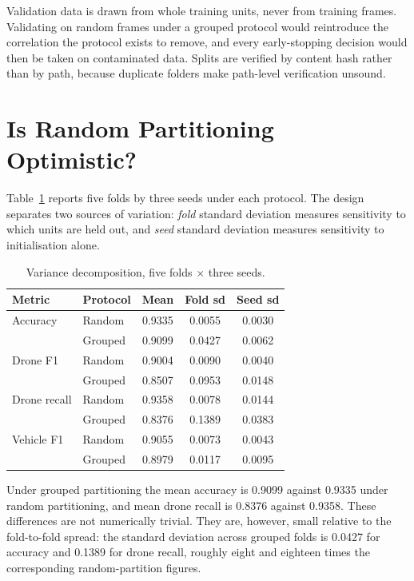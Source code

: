 \documentclass[conference]{IEEEtran}
\begin{document}
Validation data is drawn from whole training units, never from training
frames. Validating on random frames under a grouped protocol would
reintroduce the correlation the protocol exists to remove, and every
early-stopping decision would then be taken on contaminated data. Splits are
verified by content hash rather than by path, because duplicate folders make
path-level verification unsound.

\section{Is Random Partitioning Optimistic?}
\label{sec:leak}

Table~\ref{tab:kfold} reports five folds by three seeds under each protocol.
The design separates two sources of variation: \emph{fold} standard
deviation measures sensitivity to which units are held out, and \emph{seed}
standard deviation measures sensitivity to initialisation alone.

\begin{table}[t]
\caption{Variance decomposition, five folds $\times$ three seeds.}
\label{tab:kfold}
\centering
\small
\setlength{\tabcolsep}{4pt}
\begin{tabular}{llccc}
\toprule
Metric & Protocol & Mean & Fold sd & Seed sd \\
\midrule
Accuracy       & Random  & 0.9335 & 0.0055 & 0.0030 \\
               & Grouped & 0.9099 & 0.0427 & 0.0062 \\
Drone F1       & Random  & 0.9004 & 0.0090 & 0.0040 \\
               & Grouped & 0.8507 & 0.0953 & 0.0148 \\
Drone recall   & Random  & 0.9358 & 0.0078 & 0.0144 \\
               & Grouped & 0.8376 & 0.1389 & 0.0383 \\
Vehicle F1     & Random  & 0.9055 & 0.0073 & 0.0043 \\
               & Grouped & 0.8979 & 0.0117 & 0.0095 \\
\bottomrule
\end{tabular}
\end{table}

Under grouped partitioning the mean accuracy is 0.9099 against 0.9335 under
random partitioning, and mean drone recall is 0.8376 against 0.9358. These
differences are not numerically trivial. They are, however, small relative to
the fold-to-fold spread: the standard deviation across grouped folds is
0.0427 for accuracy and 0.1389 for drone recall, roughly eight and eighteen
times the corresponding random-partition figures.
\end{document}
